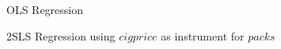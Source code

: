 OLS Regression\\
\begin{stlog}\end{stlog}
2SLS Regression using $cigprice$ as instrument for $packs$
\begin{stlog}\end{stlog}
